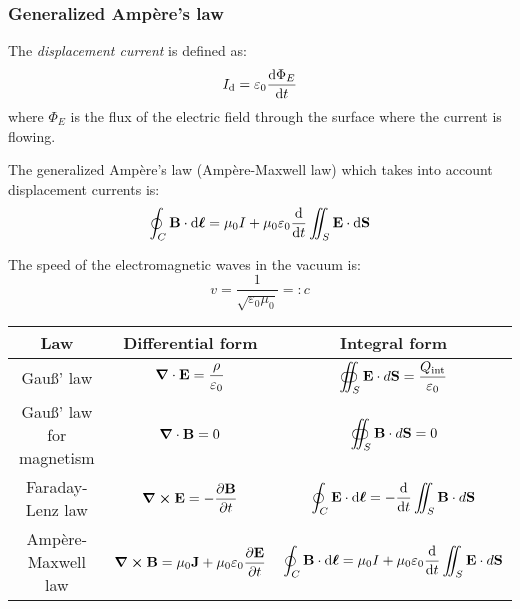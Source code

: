 \documentclass[../../../main.tex]{subfiles}
\begin{document}
\begin{multicols}{2}
  \subsubsection{Generalized Ampère's law}
  \begin{definition}
    The \emph{displacement current} is defined as: $$I_\text{d}=\varepsilon_0\dv{\Phi_E}{t}$$ where $\Phi_E$ is the flux of the electric field through the surface where the current is flowing.
  \end{definition}
  \begin{law}
    The generalized Ampère's law (Ampère-Maxwell law) which takes into account displacement currents is: $$\oint_C\boldsymbol{\mathrm{B}}\cdot \dd\boldsymbol{\mathrm{\ell}}=\mu_0 I+\mu_0\varepsilon_0\dv{}{t}\iint_S\boldsymbol{\mathrm{E}}\cdot \dd\boldsymbol{\mathrm{S}}$$
  \end{law}
  \begin{definition}
    The speed of the electromagnetic waves in the vacuum is: $$v=\frac{1}{\sqrt{\varepsilon_0\mu_0}}=:c$$
  \end{definition}
\end{multicols}
\begin{table}[ht]
  \centering
  \renewcommand{\arraystretch}{2.5}
  \begin{tabular}{|c|c|c|}
    \hline
    \bfseries Law             & \bfseries Differential form                                                                                & \bfseries Integral form                                                                                      \\
    \hline
    Gau\ss' law               & $\displaystyle \boldsymbol{\mathrm{\grad}}\cdot\boldsymbol{\mathrm{E}}=\frac{\rho}{\varepsilon_0}$                                           & $\displaystyle \oiint_S\boldsymbol{\mathrm{E}}\cdot d\boldsymbol{\mathrm{S}}=\frac{Q_{\text{int}}}{\varepsilon_0}$                             \\
    \hline
    Gau\ss' law for magnetism & $\displaystyle \boldsymbol{\mathrm{\grad}}\cdot\boldsymbol{\mathrm{B}}=0$                                                                    & $\displaystyle \oiint_S\boldsymbol{\mathrm{B}}\cdot d\boldsymbol{\mathrm{S}}=0$                                                                \\
    \hline
    Faraday-Lenz law          & $\displaystyle \vf{\grad}\crossprod\vf{E}=-\frac{\partial\vf{B}}{\partial t}$                              & $\displaystyle \oint_C\boldsymbol{\mathrm{E}}\cdot \dd\boldsymbol{\mathrm{\ell}}=-\dv{}{t}\iint_S\boldsymbol{\mathrm{B}}\cdot d\boldsymbol{\mathrm{S}}$                          \\
    \hline
    Ampère-Maxwell law        & $\displaystyle \vf{\grad}\crossprod\vf{B}=\mu_0\vf{J}+\mu_0\varepsilon_0\frac{\partial\vf{E}}{\partial t}$ & $\displaystyle \oint_C\boldsymbol{\mathrm{B}}\cdot \dd\boldsymbol{\mathrm{\ell}}=\mu_0 I+\mu_0\varepsilon_0\dv{}{t}\iint_S\boldsymbol{\mathrm{E}}\cdot d\boldsymbol{\mathrm{S}}$ \\
    \hline
  \end{tabular}
\end{table}
\end{document}
